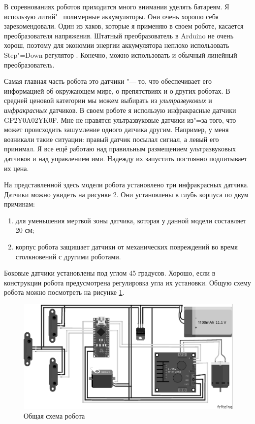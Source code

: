 \documentclass[10pt, a5paper]{article}
\begin{document}
В соревнованиях роботов приходится много внимания уделять батареям. Я использую литий"=полимерные аккумуляторы. Они \linebreak очень хорошо себя зарекомендовали. Один из хаков, которые я применяю в своем роботе, касается преобразователя напряжения. Штатный преобразователь в Arduino не очень хорош, поэтому для экономии энергии аккумулятора неплохо использовать Step"=Down регулятор \cite{bib2}. Конечно, можно использовать и обычный линейный преобразователь.

Самая главная часть робота это датчики "--- то, что обеспечивает его информацией об окружающем мире, о препятствиях и о других роботах. В средней ценовой категории мы можем выбирать из \emph{ультразвуковых} и \emph{инфракрасных} датчиков. В своем роботе я использую инфракрасные датчики GP2Y0A02YK0F. Мне не нравятся ультразвуковые датчики из"=за того, что может происходить зашумление одного датчика другим. Например, у меня возникали такие ситуации: правый датчик посылал сигнал, а левый его принимал. Я все ещё работаю над правильным размещением ультразвуковых датчиков и над управлением ими. Надежду их запустить постоянно подпитывает их цена.

На представленной здесь модели робота установлено три инфракрасных датчика. Датчики можно увидеть на рисунке 2. Они установлены в глубь корпуса по двум причинам:

\begin{enumerate}
  \item для уменьшения мертвой зоны датчика, которая у данной модели составляет 20 см;
  \item корпус робота защищает датчики от механических повреждений во время столкновений с другими роботами.
\end{enumerate}

Боковые датчики установлены под углом 45 градусов. Хорошо, если в конструкции робота предусмотрена регулировка угла их установки.
Общую схему робота можно посмотреть на рисунке \ref{sklipus5}.

\begin{figure}[h!]
  \centering 
   \includegraphics[scale=0.4]{12_2015_fig5}
    \caption{Общая схема робота}\label{sklipus5}
\end{figure}
\end{document}
